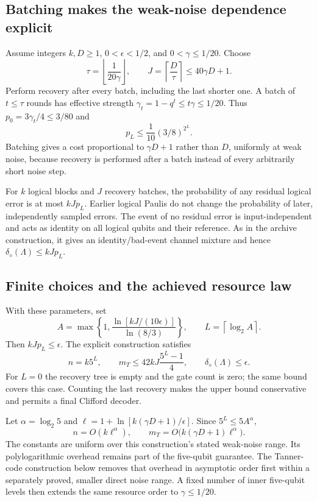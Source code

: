 \documentclass[11pt,a4paper]{article}
\numberwithin{equation}{section}
\theoremstyle{remark}\newtheorem*{remark}{Interpretation}
\newcommand{\eps}{\epsilon}
\newcommand{\dd}{\delta_{\diamond}}
\begin{document}
\subsection{Batching makes the weak-noise dependence explicit}
Assume integers $k,D\ge1$, $0<\eps<1/2$, and $0<\gamma\le1/20$. Choose
\begin{equation}
\tau=\left\lfloor\frac1{20\gamma}\right\rfloor,
\qquad J=\left\lceil\frac D\tau\right\rceil\le40\gamma D+1.
\end{equation}
Perform recovery after every batch, including the last shorter one. A batch of $t\le\tau$ rounds has effective strength $\gamma_t=1-q^t\le t\gamma\le1/20$. Thus $p_0=3\gamma_t/4\le3/80$ and
\begin{equation}
p_L\le\frac1{10}(3/8)^{2^L}.
\end{equation}
Batching gives a cost proportional to $\gamma D+1$ rather than $D$, uniformly at weak noise, because recovery is performed after a batch instead of every arbitrarily short noise step.

For $k$ logical blocks and $J$ recovery batches, the probability of any residual logical error is at most $kJp_L$. Earlier logical Paulis do not change the probability of later, independently sampled errors. The event of no residual error is input-independent and acts as identity on all logical qubits and their reference. As in the archive construction, it gives an identity/bad-event channel mixture and hence $\dd(\Lambda)\le kJp_L$.

\subsection{Finite choices and the achieved resource law}
With these parameters, set
\begin{equation}
A=\max\left\{1,\frac{\ln[kJ/(10\eps)]}{\ln(8/3)}\right\},
\qquad L=\left\lceil\log_2 A\right\rceil.
\end{equation}
Then $kJp_L\le\eps$. The explicit construction satisfies
\begin{equation}
n=k5^L,\qquad
m_T\le42kJ\frac{5^L-1}{4},\qquad
\dd(\Lambda)\le\eps.
\label{eq:explicitupper}
\end{equation}
For $L=0$ the recovery tree is empty and the gate count is zero; the same bound covers this case. Counting the last recovery makes the upper bound conservative and permits a final Clifford decoder.

Let $\alpha=\log_2 5$ and $\ell=1+\ln[k(\gamma D+1)/\eps]$. Since $5^L\le5A^\alpha$,
\begin{equation}
\boxed{n=O(k\ell^\alpha),\qquad
m_T=O\bigl(k(\gamma D+1)\ell^\alpha\bigr).}
\label{eq:upper}
\end{equation}
The constants are uniform over this construction's stated weak-noise range. Its polylogarithmic overhead remains part of the five-qubit guarantee. The Tanner-code construction below removes that overhead in asymptotic order first within a separately proved, smaller direct noise range. A fixed number of inner five-qubit levels then extends the same resource order to $\gamma\le1/20$.
\end{document}
